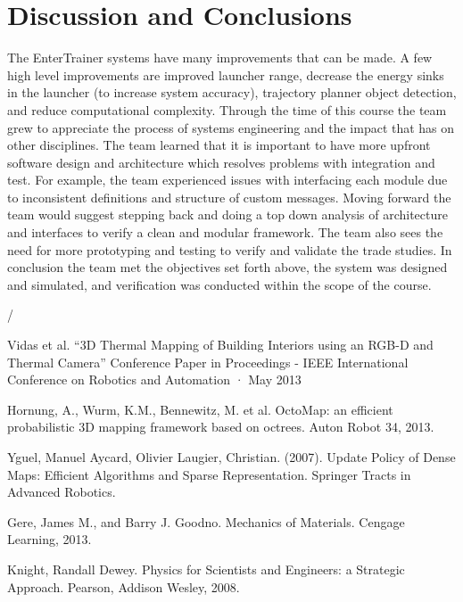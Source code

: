 \documentclass[11pt]{article}
\begin{document}
\section{Discussion and Conclusions}

The EnterTrainer systems have many improvements that can be made. A few high level improvements are improved launcher range, decrease the energy sinks in the launcher (to increase system accuracy), trajectory planner object detection, and reduce computational complexity.  Through the time of this course the team grew to appreciate the process of systems engineering and the impact that has on other disciplines.  The team learned that it is important to have more upfront software design and architecture which resolves problems with integration and test.  For example, the team experienced issues with interfacing each module due to inconsistent definitions and structure of custom messages.  Moving forward the team would suggest stepping back and doing a top down analysis of architecture and interfaces to verify a clean and modular framework.  The team also sees the need for more prototyping and testing to verify and validate the trade studies. In conclusion the team met the objectives set forth above, the system was designed and simulated, and verification was conducted within the scope of the course.  


/

%

\begin{thebibliography}{1}
Vidas et al. “3D Thermal Mapping of Building Interiors using an RGB-D and Thermal Camera”  Conference Paper in Proceedings - IEEE International Conference on Robotics and Automation · May 2013

Hornung, A., Wurm, K.M., Bennewitz, M. et al. OctoMap: an efficient probabilistic 3D mapping framework based on octrees. Auton Robot 34, 2013. 

Yguel, Manuel Aycard, Olivier Laugier, Christian. (2007). Update Policy of Dense Maps: Efficient Algorithms and Sparse Representation. Springer Tracts in Advanced Robotics. 

Gere, James M., and Barry J. Goodno. Mechanics of Materials. Cengage Learning, 2013.

Knight, Randall Dewey. Physics for Scientists and Engineers: a Strategic Approach. Pearson, Addison Wesley, 2008. 

\end{thebibliography}
\end{document}
